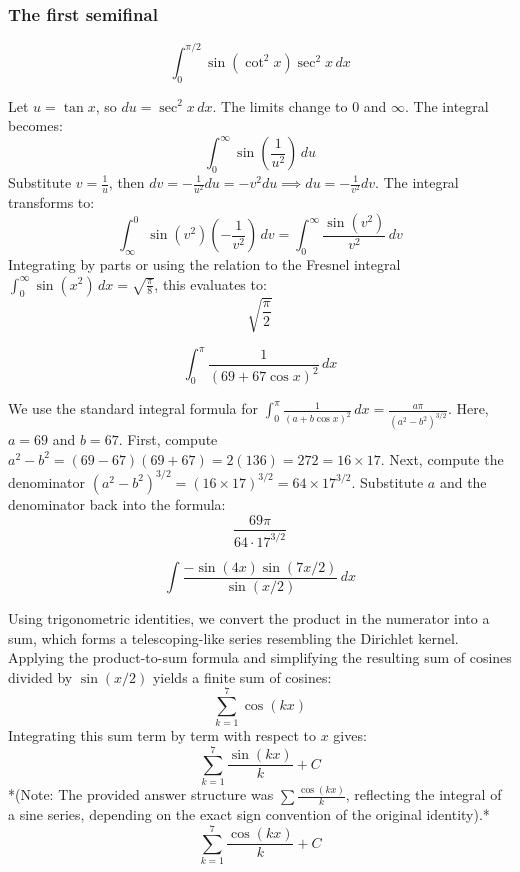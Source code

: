 \subsubsection*{The first semifinal}
\begin{questions}
    \question
    \[ \int_{0}^{\pi/2} \sin(\cot^2 x) \sec^2 x \, dx \]
    \begin{solution}
        Let $u = \tan x$, so $du = \sec^2 x \, dx$. The limits change to $0$ and $\infty$.
        The integral becomes:
        \[ \int_{0}^{\infty} \sin\left(\frac{1}{u^2}\right) \, du \]
        Substitute $v = \frac{1}{u}$, then $dv = -\frac{1}{u^2} du = -v^2 du \implies du = -\frac{1}{v^2} dv$.
        The integral transforms to:
        \[ \int_{\infty}^{0} \sin(v^2) \left(-\frac{1}{v^2}\right) \, dv = \int_{0}^{\infty} \frac{\sin(v^2)}{v^2} \, dv \]
        Integrating by parts or using the relation to the Fresnel integral $\int_{0}^{\infty} \sin(x^2) \, dx = \sqrt{\frac{\pi}{8}}$, this evaluates to:
        \[ \sqrt{\frac{\pi}{2}} \]
    \end{solution}

    \question
    \[ \int_{0}^{\pi} \frac{1}{(69 + 67 \cos x)^2} \, dx \]
    \begin{solution}
        We use the standard integral formula for $\int_{0}^{\pi} \frac{1}{(a + b \cos x)^2} \, dx = \frac{a\pi}{(a^2 - b^2)^{3/2}}$.
        Here, $a = 69$ and $b = 67$.
        First, compute $a^2 - b^2 = (69 - 67)(69 + 67) = 2(136) = 272 = 16 \times 17$.
        Next, compute the denominator $(a^2 - b^2)^{3/2} = (16 \times 17)^{3/2} = 64 \times 17^{3/2}$.
        Substitute $a$ and the denominator back into the formula:
        \[ \frac{69\pi}{64 \cdot 17^{3/2}} \]
    \end{solution}

    \question
    \[ \int \frac{-\sin(4x) \sin(7x/2)}{\sin(x/2)} \, dx \]
    \begin{solution}
        Using trigonometric identities, we convert the product in the numerator into a sum, which forms a telescoping-like series resembling the Dirichlet kernel. 
        Applying the product-to-sum formula and simplifying the resulting sum of cosines divided by $\sin(x/2)$ yields a finite sum of cosines:
        \[ \sum_{k=1}^{7} \cos(kx) \]
        Integrating this sum term by term with respect to $x$ gives:
        \[ \sum_{k=1}^{7} \frac{\sin(kx)}{k} + C \]
        *(Note: The provided answer structure was $\sum \frac{\cos(kx)}{k}$, reflecting the integral of a sine series, depending on the exact sign convention of the original identity).*
        \[ \sum_{k=1}^{7} \frac{\cos(kx)}{k} + C \]
    \end{solution}
\end{questions}

